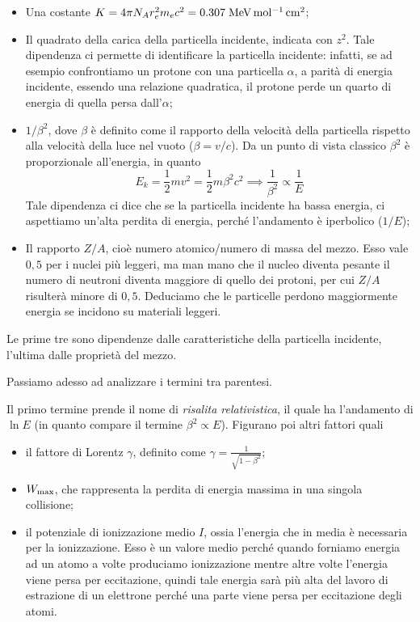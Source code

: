 \begin{itemize}
    \item Una costante $K=4 \pi N_A r_e^2 m_e c^2=0.307 \; \rm MeV \, mol^{-1} \, cm^2$;
    \item Il quadrato della carica della particella incidente, indicata con $z^2$. Tale dipendenza ci permette di identificare la particella incidente: infatti, se ad esempio confrontiamo un protone con una particella $\alpha$, a parità di energia incidente, essendo una relazione quadratica, il protone perde un quarto di energia di quella persa dall'$\alpha$;
    \item $1/\beta^2$, dove $\beta$ è definito come il rapporto della velocità della particella rispetto alla velocità della luce nel vuoto ($\beta=v/c$). Da un punto di vista classico $\beta^2$ è proporzionale all'energia, in quanto
    \begin{equation*}
        E_k
        =\frac{1}{2}mv^2
        =\frac{1}{2}m \beta^2 c^2
        \implies
        \frac{1}{\beta^2} \propto \frac{1}{E}
    \end{equation*}
    Tale dipendenza ci dice che se la particella incidente ha bassa energia, ci aspettiamo un'alta perdita di energia, perché l'andamento è iperbolico ($1/E$);
    \item Il rapporto $Z/A$, cioè numero atomico/numero di massa del mezzo. Esso vale $0,5$ per i nuclei più leggeri, ma man mano che il nucleo diventa pesante il numero di neutroni diventa maggiore di quello dei protoni, per cui $Z/A$ risulterà minore di $0,5$. Deduciamo che le particelle perdono maggiormente energia se incidono su materiali leggeri.
\end{itemize}

Le prime tre sono dipendenze dalle caratteristiche della particella incidente, l'ultima dalle proprietà del mezzo.

Passiamo adesso ad analizzare i termini tra parentesi.

Il primo termine prende il nome di \textit{risalita relativistica}, il quale ha l'andamento di $\ln E$ (in quanto compare il termine $\beta^2 \propto E$). Figurano poi altri fattori quali

\begin{itemize}[label=$-$]
    \item il fattore di Lorentz $\gamma$, definito come $\gamma=\frac{1}{\sqrt{1 - \beta^2}}$;
    \item $W_{\rm max}$, che rappresenta la perdita di energia massima in una singola collisione;
    \item il potenziale di ionizzazione medio $I$, ossia l'energia che in media è necessaria per la ionizzazione. Esso è un valore medio perché quando forniamo energia ad un atomo a volte produciamo ionizzazione mentre altre volte l'energia viene persa per eccitazione, quindi tale energia sarà più alta del lavoro di estrazione di un elettrone perché una parte viene persa per eccitazione degli atomi.
\end{itemize}

